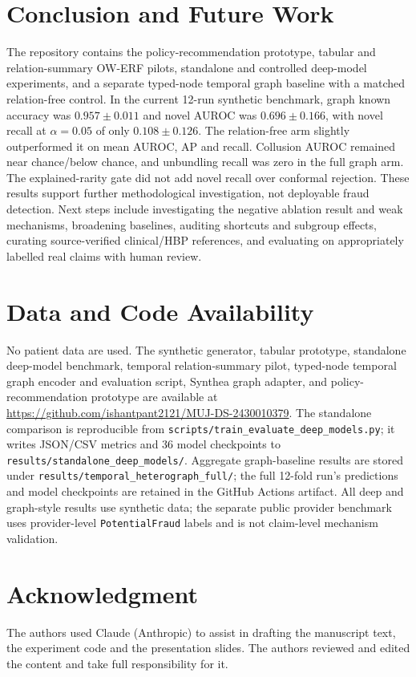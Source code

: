 \documentclass[conference]{IEEEtran}
\begin{document}
\section{Conclusion and Future Work}
The repository contains the policy-recommendation prototype, tabular and relation-summary OW-ERF pilots, standalone and controlled deep-model experiments, and a separate typed-node temporal graph baseline with a matched relation-free control. In the current 12-run synthetic benchmark, graph known accuracy was $0.957\pm0.011$ and novel AUROC was $0.696\pm0.166$, with novel recall at $\alpha=0.05$ of only $0.108\pm0.126$. The relation-free arm slightly outperformed it on mean AUROC, AP and recall. Collusion AUROC remained near chance/below chance, and unbundling recall was zero in the full graph arm. The explained-rarity gate did not add novel recall over conformal rejection. These results support further methodological investigation, not deployable fraud detection. Next steps include investigating the negative ablation result and weak mechanisms, broadening baselines, auditing shortcuts and subgroup effects, curating source-verified clinical/HBP references, and evaluating on appropriately labelled real claims with human review.

\section*{Data and Code Availability}
No patient data are used. The synthetic generator, tabular prototype, standalone deep-model benchmark, temporal relation-summary pilot, typed-node temporal graph encoder and evaluation script, Synthea graph adapter, and policy-recommendation prototype are available at \url{https://github.com/ishantpant2121/MUJ-DS-2430010379}. The standalone comparison is reproducible from \texttt{scripts/train\_evaluate\_deep\_models.py}; it writes JSON/CSV metrics and 36 model checkpoints to \texttt{results/standalone\_deep\_models/}. Aggregate graph-baseline results are stored under \texttt{results/temporal\_heterograph\_full/}; the full 12-fold run's predictions and model checkpoints are retained in the GitHub Actions artifact. All deep and graph-style results use synthetic data; the separate public provider benchmark uses provider-level \texttt{PotentialFraud} labels and is not claim-level mechanism validation.

\section*{Acknowledgment}
The authors used Claude (Anthropic) to assist in drafting the manuscript text, the experiment code and the presentation slides. The authors reviewed and edited the content and take full responsibility for it.



\end{document}
